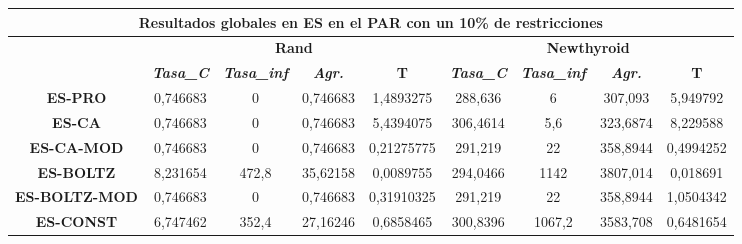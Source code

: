 \documentclass[12pt, spanish]{article}
\begin{document}
\begin{table}[H]
\hspace*{-1.2cm}\begin{tabular}{|c|c|c|c|c|c|c|c|c|}
\hline
\multicolumn{9}{|c|}{\textbf{Resultados globales en ES en el PAR con un 10\% de restricciones}}                                                                                                                                         \\ \hline
\multicolumn{1}{|l|}{\multirow{2}{*}{}} & \multicolumn{4}{c|}{\textbf{Rand}}                                                            & \multicolumn{4}{c|}{\textbf{Newthyroid}}                                                      \\ \cline{2-9} 
\multicolumn{1}{|l|}{}                  & \textit{\textbf{Tasa\_C}} & \textit{\textbf{Tasa\_inf}} & \textit{\textbf{Agr.}} & \textbf{T} & \textit{\textbf{Tasa\_C}} & \textit{\textbf{Tasa\_inf}} & \textit{\textbf{Agr.}} & \textbf{T} \\ \hline
\textbf{ES-PRO}                         & 0,746683                  & 0                           & 0,746683               & 1,4893275  & 288,636                   & 6                           & 307,093                & 5,949792   \\ \hline
\textbf{ES-CA}                          & 0,746683                  & 0                           & 0,746683               & 5,4394075  & 306,4614                  & 5,6                         & 323,6874               & 8,229588   \\ \hline
\textbf{ES-CA-MOD}                      & 0,746683                  & 0                           & 0,746683               & 0,21275775 & 291,219                   & 22                          & 358,8944               & 0,4994252  \\ \hline
\textbf{ES-BOLTZ}                       & 8,231654                  & 472,8                       & 35,62158               & 0,0089755  & 294,0466                  & 1142                        & 3807,014               & 0,018691   \\ \hline
\textbf{ES-BOLTZ-MOD}                   & 0,746683                  & 0                           & 0,746683               & 0,31910325 & 291,219                   & 22                          & 358,8944               & 1,0504342  \\ \hline
\textbf{ES-CONST}                       & 6,747462                  & 352,4                       & 27,16246               & 0,6858465  & 300,8396                  & 1067,2                      & 3583,708               & 0,6481654  \\ \hline
\end{tabular}
\end{table}
\end{document}
